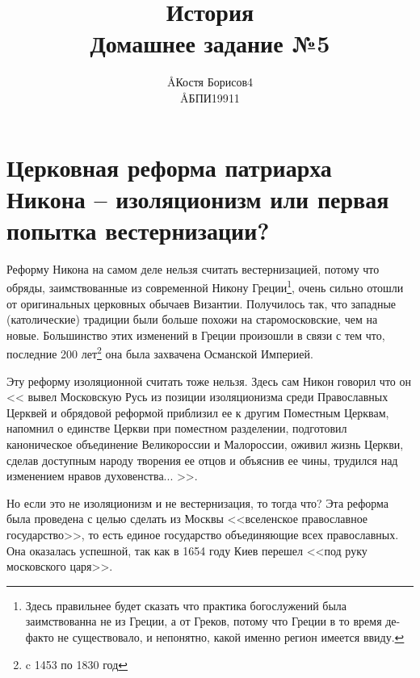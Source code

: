 \documentclass[12pt]{article}
\title{История \\ Домашнее задание №5}
\author{\AA{Костя Борисов}{4} \\ \AA{БПИ199}{11}}
\begin{document}
  \maketitle

  \section{Церковная реформа патриарха Никона -- изоляционизм\protect\footnotemark{} или первая попытка вестернизации\protect\footnotemark{}?}
  \addtocounter{footnote}{-2}

  Реформу Никона на самом деле нельзя считать вестернизацией, потому что обряды,
  заимствованные из современной Никону Греции\footnote{
    Здесь правильнее будет сказать что практика богослужений была заимствованна не из Греции,
    а от Греков, потому что Греции в то время де-факто не существовало,
    и непонятно, какой именно регион имеется ввиду.
  },
  очень сильно отошли от оригинальных церковных обычаев Византии.
  Получилось так, что западные (католические) традиции были больше похожи на старо\-московские, чем на новые.
  Большинство этих изменений в Греции произошли в связи с тем что,
  последние 200 лет\footnote{c 1453 по 1830 год} она была захвачена Османской Империей.

  Эту реформу изоляционной считать тоже нельзя.
  Здесь сам Никон говорил что он <<%
    вывел Московскую Русь из позиции изоляционизма среди Православных Церквей и обрядовой реформой приблизил ее к другим Поместным Церквам,
    напомнил о единстве Церкви при поместном разделении,
    подготовил каноническое объединение Великороссии и Малороссии,
    оживил жизнь Церкви, сделав доступным народу творения ее отцов и объяснив ее чины,
    трудился над изменением нравов духовенства...%
  >>.

  Но если это не изоляционизм и не вестернизация, то тогда что?
  Эта реформа была проведена с целью сделать из Москвы <<вселенское православное государство>>,
  то есть единое государство объединяющие всех православных.
  Она оказалась успешной, так как в 1654 году Киев перешел <<под руку московского царя>>.
\end{document}
